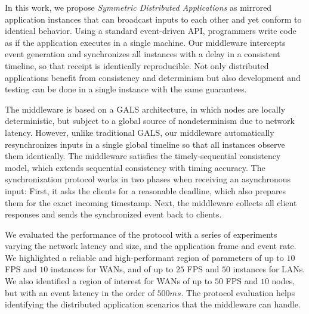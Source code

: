 \documentclass[sigplan,screen]{acmart}
\begin{document}
In this work, we propose \emph{Symmetric Distributed Applications} as mirrored
application instances that can broadcast inputs to each other and yet conform
to identical behavior.
%
Using a standard event-driven API, programmers write code as if the application
executes in a single machine.
Our middleware intercepts event generation and synchronizes all instances with
a delay in a consistent timeline, so that receipt is identically reproducible.
%
Not only distributed applications benefit from consistency and determinism but
also development and testing can be done in a single instance with the same
guarantees.

The middleware is based on a GALS architecture, in which nodes are locally
deterministic, but subject to a global source of nondeterminism due to network
latency.
However, unlike traditional GALS, our middleware automatically resynchronizes
inputs in a single global timeline so that all instances observe them
identically.
The middleware satisfies the timely-sequential consistency model, which extends
sequential consistency with timing accuracy.
The synchronization protocol works in two phases when receiving an asynchronous
input:
First, it asks the clients for a reasonable deadline, which also prepares them
for the exact incoming timestamp.
Next, the middleware collects all client responses and sends the synchronized
event back to clients.

We evaluated the performance of the protocol with a series of experiments
varying the network latency and size, and the application frame and event rate.
%
We highlighted a reliable and high-performant region of parameters of up to
$10$ FPS and $10$ instances for WANs, and of up to $25$ FPS and $50$ instances
for LANs.
We also identified a region of interest for WANs of up to $50$ FPS and $10$
nodes, but with an event latency in the order of $500ms$.
%
The protocol evaluation helps identifying the distributed application scenarios
that the middleware can handle.



\end{document}
